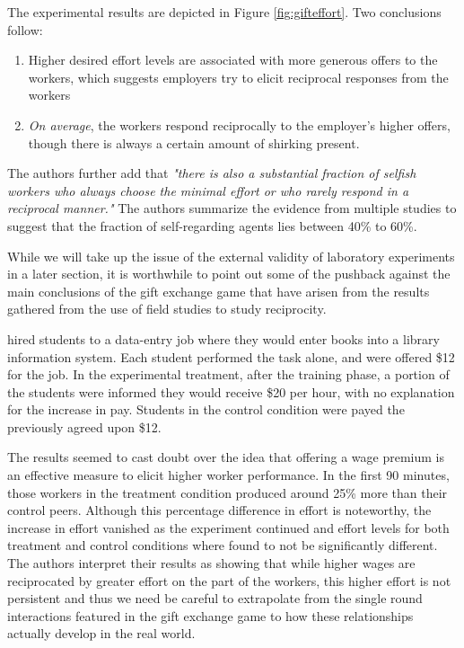 \documentclass[12pt]{article}
\begin{document}
The experimental results are depicted in Figure \ref{fig:gifteffort}. Two conclusions follow:

\begin{enumerate}

\item Higher desired effort levels are associated with more generous offers to the workers, which suggests employers try to elicit reciprocal responses from the workers
\item \textit{On average}, the workers respond reciprocally to the employer's higher offers, though there is always a certain amount of shirking present.

\end{enumerate}

The authors further add that \textit{"there is also a substantial fraction of selfish workers who always choose the minimal effort or who rarely respond in a reciprocal manner."} The authors summarize the evidence from multiple studies to suggest that the fraction of self-regarding agents lies between 40\% to 60\%.


While we will take up the issue of the external validity of laboratory experiments in a later section, it is worthwhile to point out some of the pushback against the main conclusions of the gift exchange game that have arisen from the results gathered from the use of field studies to study reciprocity.  

\cite{Gneezy2006} hired students to a data-entry job where they would enter books into a library information system. Each student performed the task alone, and were offered \$12 for the job. In the experimental treatment, after the training phase, a portion of the students were informed they would receive \$20 per hour, with no explanation for the increase in pay. Students in the control condition were payed the previously agreed upon \$12. 

The results seemed to cast doubt over the idea that offering a wage premium is an effective measure to elicit higher worker performance. In the first 90 minutes, those workers in the treatment condition produced around 25\% more than their control peers. Although this percentage difference in effort is noteworthy, the increase in effort vanished as the experiment continued and effort levels for both treatment and control conditions where found to not be significantly different. The authors interpret their results as showing that while higher wages are reciprocated by greater effort on the part of the workers, this higher effort is not persistent and thus we need be careful to extrapolate from the single round interactions featured in the gift exchange game to how these relationships actually develop in the real world. 
\end{document}
